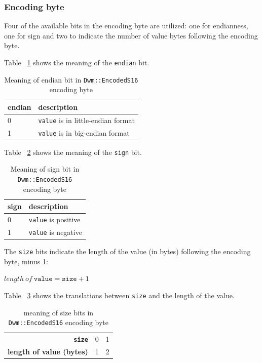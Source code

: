 \subsubsection{Encoding byte}
Four of the available bits in the encoding byte are utilized: one for
endianness, one for sign and two to indicate the number of value
bytes following the encoding byte.

  Table
~\ref{table:EncodedS16EndianBit} shows the meaning of the
\texttt{endian} bit.

\begin{table}[H]
\begin{center}
\begin{tabular}{ll}
  \textbf{endian} & \textbf{description} \\ \hline
  0 & \texttt{value} is in little-endian format \\ \hline
  1 & \texttt{value} is in big-endian format \\
\end{tabular}
\caption{Meaning of endian bit in \texttt{Dwm::EncodedS16} encoding byte}
\label{table:EncodedS16EndianBit}
\end{center}
\end{table}

Table ~\ref{table:EncodedS16SignBit} shows the meaning of the
\texttt{sign} bit.

\begin{table}[H]
\begin{center}
\begin{tabular}{ll}
  \textbf{sign} & \textbf{description} \\ \hline
  0 & \texttt{value} is positive \\ \hline
  1 & \texttt{value} is negative \\
\end{tabular}
\caption{Meaning of sign bit in \texttt{Dwm::EncodedS16} encoding byte}
\label{table:EncodedS16SignBit}
\end{center}
\end{table}

The \texttt{size} bits indicate the length of the value (in bytes)
following the encoding byte, minus 1:

  $length\ of\ \texttt{value} = \texttt{size} + 1$

Table ~\ref{table:EncodedS16SizeBits} shows the translations between
\texttt{size} and the length of the value.

\begin{table}[H]
\begin{center}
\begin{tabular}{r|l|l}
  \textbf{\texttt{size}} & 0 & 1 \\
  \textbf{length of value (bytes)} & 1 & 2  \\
\end{tabular}
\end{center}
\caption{meaning of size bits in \texttt{Dwm::EncodedS16} encoding byte}
\label{table:EncodedS16SizeBits}
\end{table}

